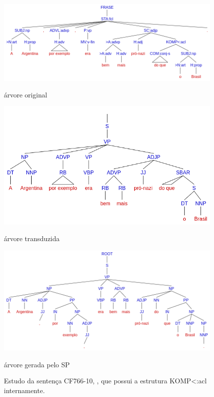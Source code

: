 \begin{figure}[!hb]
    \centering
    \begin{minipage}{.45\textwidth}
        \includegraphics[width=\linewidth]{imagens/ec_bosque_komp_tree_orig.png}
        \caption{árvore original}
    \end{minipage}
    \begin{minipage}{.45\textwidth}
        \includegraphics[width=\linewidth]{imagens/ec_bosque_komp_tree_trans.png}
        \caption{árvore transduzida}
    \end{minipage}
    \begin{minipage}{.45\textwidth}
        \includegraphics[width=\linewidth]{imagens/ec_bosque_komp_tree_sp.png}
        \caption{árvore gerada pelo SP}
    \end{minipage}

    \caption[Estudo de caso BOSQUE - Sentença transduzida com KOMP<:acl]{Estudo da sentença CF766-10, , que possui a estrutura KOMP<:acl internamente.}
    \label{fig:ec_bosque_komp_tree}
\end{figure}